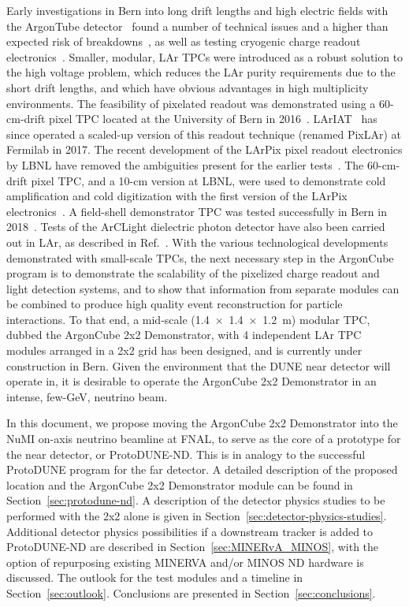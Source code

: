 Early investigations in Bern into long drift lengths and high electric fields with the ArgonTube detector~\cite{argontube_design} found a number of technical issues and a higher than expected risk of breakdowns~\cite{argontube}, as well as testing cryogenic charge readout electronics~\cite{art_cold_ero}. Smaller, modular, LAr TPCs were introduced as a robust solution to the high voltage problem, which reduces the LAr purity requirements due to the short drift lengths, and which have obvious advantages in high multiplicity environments. The feasibility of pixelated readout was demonstrated using a 60-cm-drift pixel TPC located at the University of Bern in 2016~\cite{pixels}. LArIAT~\cite{lariat} has since operated a scaled-up version of this readout technique (renamed PixLAr) at Fermilab in 2017. The recent development of the LArPix pixel readout electronics by LBNL have removed the ambiguities present for the earlier tests~\cite{larpix}. The 60-cm-drift pixel TPC, and a 10-cm version at LBNL, were used to demonstrate cold amplification and cold digitization with the first version of the LArPix electronics~\cite{larpix}. A field-shell demonstrator TPC was tested successfully in Bern in 2018~\cite{argoncube_fd}. Tests of the ArCLight dielectric photon detector have also been carried out in LAr, as described in Ref.~\cite{arclight}. With the various technological developments demonstrated with small-scale TPCs, the next necessary step in the ArgonCube program is to demonstrate the scalability of the pixelized charge readout and light detection systems, and to show that information from separate modules can be combined to produce high quality event reconstruction for particle interactions. To that end, a mid-scale (\SI[product-units=repeat]{1.4x1.4x1.2}{\metre}) modular TPC, dubbed the ArgonCube 2x2 Demonstrator, with 4 independent LAr TPC modules arranged in a 2x2 grid has been designed, and is currently under construction in Bern. Given the environment that the DUNE near detector will operate in, it is desirable to operate the ArgonCube 2x2 Demonstrator in an intense, few-GeV, neutrino beam.


In this document, we propose moving the ArgonCube 2x2 Demonstrator into the NuMI on-axis neutrino beamline at FNAL, to serve as the core of a prototype for the near detector, or ProtoDUNE-ND. This is in analogy to the successful ProtoDUNE program for the far detector. A detailed description of the proposed location and the ArgonCube 2x2 Demonstrator module can be found in Section~\ref{sec:protodune-nd}. A description of the detector physics studies to be performed with the 2x2 alone is given in Section~\ref{sec:detector-physics-studies}. Additional detector physics possibilities if a downstream tracker is added to ProtoDUNE-ND are described in Section~\ref{sec:MINERvA_MINOS}, with the option of repurposing existing MINERVA and/or MINOS ND hardware is discussed. The outlook for the test modules and a timeline in Section~\ref{sec:outlook}. Conclusions are presented in Section~\ref{sec:conclusions}.

